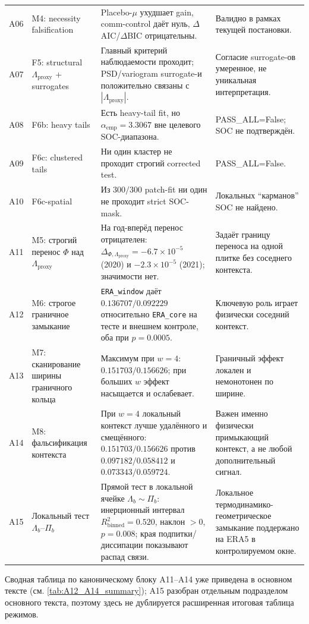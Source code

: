 \documentclass[11pt,a4paper]{article}
\theoremstyle{definition}
\theoremstyle{plain}
\theoremstyle{remark}
\begin{document}
{\begin{longtable}{@{}p{1.3cm}p{3.3cm}p{5.0cm}p{3.6cm}@{}}
A06 & M4: necessity falsification & Placebo-\(\mu\) ухудшает gain, comm-control даёт нуль, $\Delta$AIC/\(\Delta\)BIC отрицательны. & Валидно в рамках текущей постановки. \\
A07 & F5: structural $\Lambda_{\mathrm{proxy}}$ + surrogates & Главный критерий наблюдаемости проходит; PSD/variogram surrogate-и положительно связаны с \(|\Lambda_{\mathrm{proxy}}|\). & Согласие surrogate-ов умеренное, не уникальная интерпретация. \\
A08 & F6b: heavy tails & Есть heavy-tail fit, но \(\alpha_{\mathrm{emp}}=3.3067\) вне целевого SOC-диапазона. & PASS\_ALL=False; SOC не подтверждён. \\
A09 & F6c: clustered tails & Ни один кластер не проходит строгий corrected test. & PASS\_ALL=False. \\
A10 & F6c-spatial & Из $300/300$ patch-fit ни один не проходит strict SOC-mask. & Локальных ``карманов'' SOC не найдено. \\
A11 & M5: строгий перенос $\Phi$ над $\Lambda_{\mathrm{proxy}}$ & На год-вперёд перенос отрицателен: $\Delta_{\Phi,\Lambda_{\mathrm{proxy}}}=-6.7\times10^{-5}$ (2020) и $-2.3\times10^{-5}$ (2021); значимости нет. & Задаёт границу переноса на одной плитке без соседнего контекста. \\
A12 & M6: строгое граничное замыкание & \texttt{ERA\_window} даёт $0.136707/0.092229$ относительно \texttt{ERA\_core} на тесте и внешнем контроле, оба при $p=0.0005$. & Ключевую роль играет физически соседний контекст. \\
A13 & M7: сканирование ширины граничного кольца & Максимум при $w=4$: $0.151703/0.156626$; при больших $w$ эффект насыщается и ослабевает. & Граничный эффект локален и немонотонен по ширине. \\
A14 & M8: фальсификация контекста & При $w=4$ локальный контекст лучше удалённого и смещённого: $0.151703/0.156626$ против $0.097182/0.058412$ и $0.073343/0.059724$. & Важен именно физически примыкающий контекст, а не любой дополнительный сигнал. \\
A15 & Локальный тест $\Lambda_b$--$\Pi_b$ & Прямой тест в локальной ячейке \(\Lambda_b\sim\Pi_b\): инерционный интервал $R^2_{\mathrm{binned}}=0.520$, наклон $>0$, $p=0.008$; края подпитки/диссипации показывают распад связи. & Локальное термодинамико-геометрическое замыкание поддержано на ERA5 в контролируемом окне. \\
\bottomrule
\end{longtable}
}

Сводная таблица по каноническому блоку A11--A14 уже приведена в основном тексте (см. \cref{tab:A12_A14_summary}); A15 разобран отдельным подразделом основного текста, поэтому здесь не дублируется расширенная итоговая таблица режимов.
\end{document}
